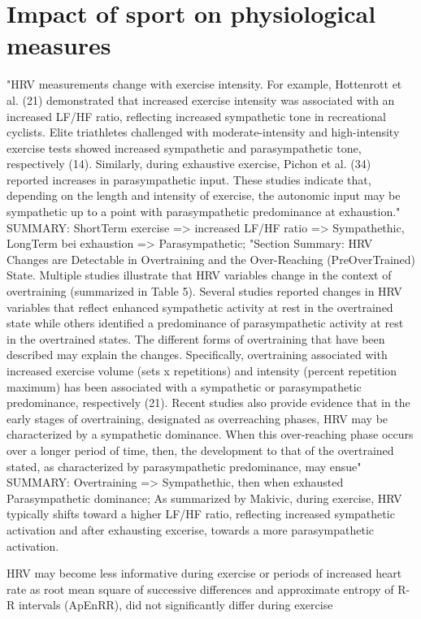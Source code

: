 \chapter{Impact of sport on physiological measures}
"HRV measurements change with exercise intensity. For
example, Hottenrott et al. (21) demonstrated that increased exercise intensity was associated with an
increased LF/HF ratio, reflecting increased sympathetic tone in recreational cyclists. Elite triathletes
challenged with moderate-intensity and high-intensity exercise tests showed increased sympathetic
and parasympathetic tone, respectively (14). Similarly, during exhaustive exercise, Pichon et al. (34)
reported increases in parasympathetic input. These studies indicate that, depending on the length
and intensity of exercise, the autonomic input may be sympathetic up to a point with parasympathetic
predominance at exhaustion."
SUMMARY: ShortTerm exercise => increased LF/HF ratio => Sympathethic, LongTerm bei exhaustion => Parasympathetic;
"Section Summary: HRV Changes are Detectable in Overtraining and the Over-Reaching (PreOverTrained) State. Multiple studies illustrate that HRV variables change in the context of
overtraining (summarized in Table 5). Several studies reported changes in HRV variables that reflect
enhanced sympathetic activity at rest in the overtrained state while others identified a predominance
of parasympathetic activity at rest in the overtrained states. The different forms of overtraining that
have been described may explain the changes. Specifically, overtraining associated with increased
exercise volume (sets x repetitions) and intensity (percent repetition maximum) has been associated
with a sympathetic or parasympathetic predominance, respectively (21). Recent studies also provide
evidence that in the early stages of overtraining, designated as overreaching phases, HRV may be
characterized by a sympathetic dominance. When this over-reaching phase occurs over a longer
period of time, then, the development to that of the overtrained stated, as characterized by
parasympathetic predominance, may ensue" 
SUMMARY: Overtraining => Sympathethic, then when exhausted Parasympathetic dominance;
As summarized by Makivic, during exercise, HRV typically shifts toward a higher LF/HF ratio, reflecting increased sympathetic activation and after exhausting excerise, towards a more parasympathetic activation.	\cite{makivic2013heart}

HRV may become less informative during exercise or periods of increased heart rate as root mean square of successive differences and approximate entropy of R-R intervals (ApEnRR), did not significantly differ during exercise\cite{boettger2010heart}

